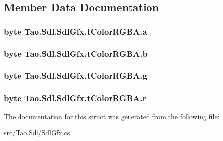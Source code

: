 \subsection{Member Data Documentation}
\hypertarget{struct_tao_1_1_sdl_1_1_sdl_gfx_1_1t_color_r_g_b_a_a59ae5d6b3a06cf02e6ccabf29cffd8b8}{
\subsubsection[{a}]{\setlength{\rightskip}{0pt plus 5cm}byte {\bf Tao.Sdl.SdlGfx.tColorRGBA.a}}}
\label{struct_tao_1_1_sdl_1_1_sdl_gfx_1_1t_color_r_g_b_a_a59ae5d6b3a06cf02e6ccabf29cffd8b8}
\hypertarget{struct_tao_1_1_sdl_1_1_sdl_gfx_1_1t_color_r_g_b_a_aa9021fb76dad99065dca1cbf49481041}{
\subsubsection[{b}]{\setlength{\rightskip}{0pt plus 5cm}byte {\bf Tao.Sdl.SdlGfx.tColorRGBA.b}}}
\label{struct_tao_1_1_sdl_1_1_sdl_gfx_1_1t_color_r_g_b_a_aa9021fb76dad99065dca1cbf49481041}
\hypertarget{struct_tao_1_1_sdl_1_1_sdl_gfx_1_1t_color_r_g_b_a_a2c313132f0c8d220f1a25e0a15a24e89}{
\subsubsection[{g}]{\setlength{\rightskip}{0pt plus 5cm}byte {\bf Tao.Sdl.SdlGfx.tColorRGBA.g}}}
\label{struct_tao_1_1_sdl_1_1_sdl_gfx_1_1t_color_r_g_b_a_a2c313132f0c8d220f1a25e0a15a24e89}
\hypertarget{struct_tao_1_1_sdl_1_1_sdl_gfx_1_1t_color_r_g_b_a_ae5b3ea66dc2bf732f4818d626bd3c0d3}{
\subsubsection[{r}]{\setlength{\rightskip}{0pt plus 5cm}byte {\bf Tao.Sdl.SdlGfx.tColorRGBA.r}}}
\label{struct_tao_1_1_sdl_1_1_sdl_gfx_1_1t_color_r_g_b_a_ae5b3ea66dc2bf732f4818d626bd3c0d3}


The documentation for this struct was generated from the following file:\begin{DoxyCompactItemize}
\item 
src/Tao.Sdl/\hyperlink{_sdl_gfx_8cs}{SdlGfx.cs}\end{DoxyCompactItemize}
